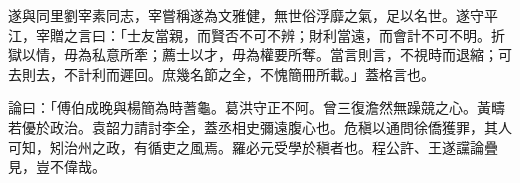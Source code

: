 \begin{pinyinscope}
 遂與同里劉宰素同志，宰嘗稱遂為文雅健，無世俗浮靡之氣，足以名世。遂守平江，宰贈之言曰：「士友當親，而賢否不可不辨；財利當遠，而會計不可不明。折獄以情，毋為私意所牽；薦士以才，毋為權要所奪。當言則言，不視時而退縮；可去則去，不計利而遲回。庶幾名節之全，不愧簡冊所載。」蓋格言也。



 論曰：「傅伯成晚與楊簡為時蓍龜。葛洪守正不阿。曾三復澹然無躁競之心。黃疇若優於政治。袁韶力請討李全，蓋丞相史彌遠腹心也。危稹以通問徐僑獲罪，其人可知，矧治州之政，有循吏之風焉。羅必元受學於稹者也。程公許、王遂讜論疊見，豈不偉哉。



\end{pinyinscope}